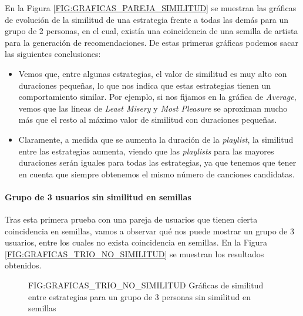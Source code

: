 En la Figura \ref{FIG:GRAFICAS_PAREJA_SIMILITUD} se muestran las gráficas de evolución de la similitud de una estrategia frente a 
todas las demás para un grupo de 2 personas, en el cual, existía una coincidencia de una semilla de artista para la generación de 
recomendaciones. De estas primeras gráficas podemos sacar las siguientes conclusiones:

\begin{itemize}
    \item Vemos que, entre algunas estrategias, el valor de similitud es muy alto con duraciones pequeñas, lo que nos indica que estas estrategias tienen
    un comportamiento similar. Por ejemplo, si nos fijamos en la gráfica de \textit{Average}, vemos que las líneas de \textit{Least Misery} y \textit{Most Pleasure}
    se aproximan mucho más que el resto al máximo valor de similitud con duraciones pequeñas.
    \item Claramente, a medida que se aumenta la duración de la \textit{playlist}, la similitud entre las estrategias aumenta, viendo que las \textit{playlists} 
    para las mayores duraciones serán iguales para todas las estrategias, ya que tenemos que tener en cuenta que siempre obtenemos el mismo número de canciones candidatas.
\end{itemize}

\paragraph{Grupo de 3 usuarios sin similitud en semillas}

Tras esta primera prueba con una pareja de usuarios que tienen cierta coincidencia en semillas, vamos a observar qué nos puede mostrar
un grupo de 3 usuarios, entre los cuales no exista coincidencia en semillas. En la Figura \ref{FIG:GRAFICAS_TRIO_NO_SIMILITUD} se muestran los
resultados obtenidos.

\begin{figure}[Gráficas de similitud entre estrategias para un grupo de 3 personas sin similitud en semillas]{FIG:GRAFICAS_TRIO_NO_SIMILITUD}
    {Gráficas de similitud entre estrategias para un grupo de 3 personas sin similitud en semillas}
\end{figure}

